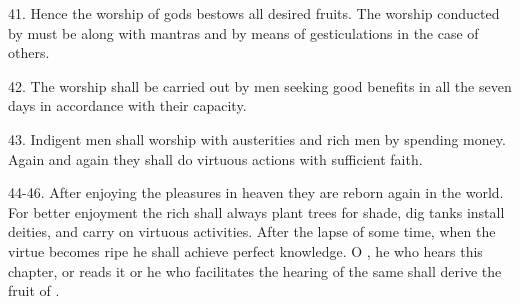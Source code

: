 41. Hence the worship of gods bestows all desired fruits. The worship conducted
by  must be along with mantras and by means of gesticulations in
the case of others.

42. The worship shall be carried out by men seeking good benefits in all
the seven days in accordance with their capacity.

43. Indigent men shall worship  with austerities and rich men by
spending money. Again and again they shall do virtuous actions with sufficient
faith.

44-46. After enjoying the pleasures in heaven they are reborn again in
the world. For better enjoyment the rich shall always plant trees for shade,
dig tanks \etc install deities, and carry on virtuous activities. After
the lapse of some time, when the virtue becomes ripe he shall achieve perfect
knowledge. O , he who hears this chapter, or reads it or he who
facilitates the hearing of the same shall derive the fruit of .
